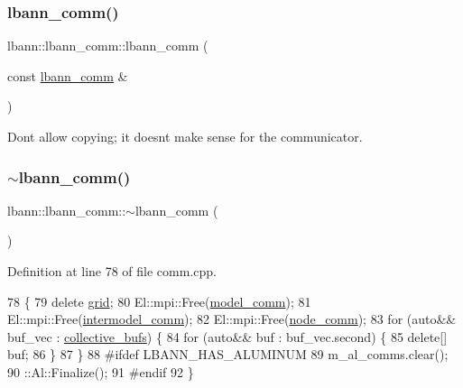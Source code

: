 \mbox{\label{classlbann_1_1lbann__comm_a198a6066e7908941898e07ebd62f8d18}} 
\subsubsection{\texorpdfstring{lbann\+\_\+comm()}{lbann\_comm()}\hspace{0.1cm}{\footnotesize\ttfamily [2/2]}}
{\footnotesize\ttfamily lbann\+::lbann\+\_\+comm\+::lbann\+\_\+comm (\begin{DoxyParamCaption}\item[{const \hyperlink{classlbann_1_1lbann__comm}{lbann\+\_\+comm} \&}]{ }\end{DoxyParamCaption})\hspace{0.3cm}{\ttfamily [delete]}}

Don\textquotesingle{}t allow copying; it doesn\textquotesingle{}t make sense for the communicator. \mbox{\label{classlbann_1_1lbann__comm_af17b1093313c5e4223f9036798f9e12f}} 
\subsubsection{\texorpdfstring{$\sim$lbann\+\_\+comm()}{~lbann\_comm()}}
{\footnotesize\ttfamily lbann\+::lbann\+\_\+comm\+::$\sim$lbann\+\_\+comm (\begin{DoxyParamCaption}{ }\end{DoxyParamCaption})}



Definition at line 78 of file comm.\+cpp.


\begin{DoxyCode}
78                         \{
79   \textcolor{keyword}{delete} \hyperlink{classlbann_1_1lbann__comm_a29fb31be115db3225b145f250a7778d9}{grid};
80   El::mpi::Free(\hyperlink{classlbann_1_1lbann__comm_a58a75b76bd61ec8a26c1cbbec3dc2f45}{model\_comm});
81   El::mpi::Free(\hyperlink{classlbann_1_1lbann__comm_a2c51c5d8faf4f0ab4f43b892c55e597b}{intermodel\_comm});
82   El::mpi::Free(\hyperlink{classlbann_1_1lbann__comm_a8aeb530ae4cedfa4d1141bb9c4704e6c}{node\_comm});
83   \textcolor{keywordflow}{for} (\textcolor{keyword}{auto}&& buf\_vec : \hyperlink{classlbann_1_1lbann__comm_a9ada8c5daf902f43b599234c7519a765}{collective\_bufs}) \{
84     \textcolor{keywordflow}{for} (\textcolor{keyword}{auto}&& buf : buf\_vec.second) \{
85       \textcolor{keyword}{delete}[] buf;
86     \}
87   \}
88 \textcolor{preprocessor}{#ifdef LBANN\_HAS\_ALUMINUM}
89   m\_al\_comms.clear();
90   ::Al::Finalize();
91 \textcolor{preprocessor}{#endif}
92 \}
\end{DoxyCode}


